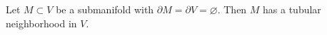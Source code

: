 Let $M \subset V$ be a submanifold with $\partial M = \partial V = \varnothing$. Then $M$ has a tubular neighborhood in $V$.
